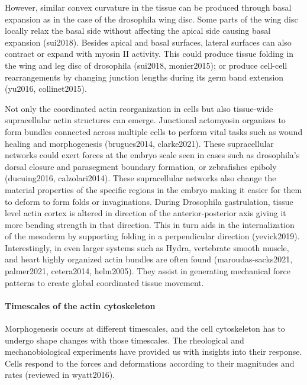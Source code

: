 \documentclass[
]{article}
\begin{document}
However, similar convex curvature in the tissue can be produced through
basal expansion as in the case of the drosophila wing disc. Some parts
of the wing disc locally relax the basal side without affecting the
apical side causing basal expansion (sui2018). Besides apical and basal
surfaces, lateral surfaces can also contract or expand with myosin II
activity. This could produce tissue folding in the wing and leg disc of
drosophila (sui2018, monier2015); or produce cell-cell rearrangements by
changing junction lengths during its germ band extension (yu2016,
collinet2015).

Not only the coordinated actin reorganization in cells but also
tissue-wide supracellular actin structures can emerge. Junctional
actomyosin organizes to form bundles connected across multiple cells to
perform vital tasks such as wound healing and morphogenesis
(brugues2014, clarke2021). These supracellular networks could exert
forces at the embryo scale seen in cases such as drosophila's dorsal
closure and parasegment boundary formation, or zebrafishes epiboly
(ducuing2016, calzolari2014). These supracellular networks also change
the material properties of the specific regions in the embryo making it
easier for them to deform to form folds or invaginations. During
Drosophila gastrulation, tissue level actin cortex is altered in
direction of the anterior-posterior axis giving it more bending strength
in that direction. This in turn aids in the internalization of the
mesoderm by supporting folding in a perpendicular direction
(yevick2019). Interestingly, in even larger systems such as Hydra,
vertebrate smooth muscle, and heart highly organized actin bundles are
often found (maroudas-sacks2021, palmer2021, cetera2014, helm2005). They
assist in generating mechanical force patterns to create global
coordinated tissue movement.

\hypertarget{timescales-of-the-actin-cytoskeleton}{%
\paragraph{Timescales of the actin
cytoskeleton}\label{timescales-of-the-actin-cytoskeleton}}

Morphogenesis occurs at different timescales, and the cell cytoskeleton
has to undergo shape changes with those timescales. The rheological and
mechanobiological experiments have provided us with insights into their
response. Cells respond to the forces and deformations according to
their magnitudes and rates (reviewed in wyatt2016).
\end{document}
